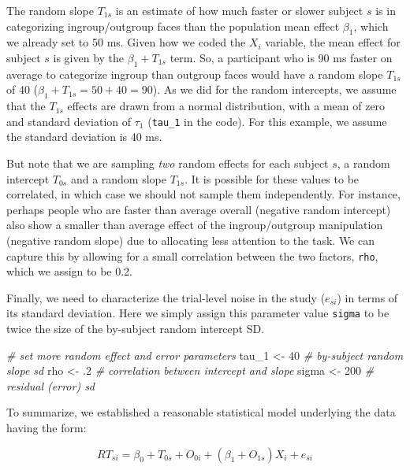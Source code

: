 \documentclass[
  english,
  doc,floatsintext]{apa6}
\newenvironment{Shaded}{\begin{snugshade}}{\end{snugshade}}
\newcommand{\CommentTok}[1]{\textcolor[rgb]{0.56,0.35,0.01}{\textit{#1}}}
\newcommand{\DecValTok}[1]{\textcolor[rgb]{0.00,0.00,0.81}{#1}}
\newcommand{\FloatTok}[1]{\textcolor[rgb]{0.00,0.00,0.81}{#1}}
\newcommand{\NormalTok}[1]{#1}
\newcommand{\StringTok}[1]{\textcolor[rgb]{0.31,0.60,0.02}{#1}}
\begin{document}
The random slope \(T_{1s}\) is an estimate of how much faster or slower subject \(s\) is in categorizing ingroup/outgroup faces than the population mean effect \(\beta_1\), which we already set to 50 ms. Given how we coded the \(X_i\) variable, the mean effect for subject \(s\) is given by the \(\beta_1 + T_{1s}\) term. So, a participant who is 90 ms faster on average to categorize ingroup than outgroup faces would have a random slope \(T_{1s}\) of 40 (\(\beta_1 + T_{1s} = 50 + 40 = 90\)). As we did for the random intercepts, we assume that the \(T_{1s}\) effects are drawn from a normal distribution, with a mean of zero and standard deviation of \(\tau_1\) (\texttt{tau\_1} in the code). For this example, we assume the standard deviation is 40 ms.

But note that we are sampling \emph{two} random effects for each subject \(s\), a random intercept \(T_{0s}\) and a random slope \(T_{1s}\). It is possible for these values to be correlated, in which case we should not sample them independently. For instance, perhaps people who are faster than average overall (negative random intercept) also show a smaller than average effect of the ingroup/outgroup manipulation (negative random slope) due to allocating less attention to the task. We can capture this by allowing for a small correlation between the two factors, \texttt{rho}, which we assign to be 0.2.

Finally, we need to characterize the trial-level noise in the study (\(e_{si}\)) in terms of its standard deviation. Here we simply assign this parameter value \texttt{sigma} to be twice the size of the by-subject random intercept SD.

\begin{Shaded}
\begin{Highlighting}[]
\CommentTok{# set more random effect and error parameters}
\NormalTok{tau_}\DecValTok{1}\NormalTok{  <-}\StringTok{  }\DecValTok{40} \CommentTok{# by-subject random slope sd}
\NormalTok{rho    <-}\StringTok{  }\FloatTok{.2} \CommentTok{# correlation between intercept and slope}
\NormalTok{sigma  <-}\StringTok{ }\DecValTok{200} \CommentTok{# residual (error) sd}
\end{Highlighting}
\end{Shaded}

To summarize, we established a reasonable statistical model underlying the data having the form:

\begin{equation}
RT_{si} = \beta_0 + T_{0s} + O_{0i} + \left(\beta_1 + O_{1s}\right) X_i + e_{si}
\end{equation}
\end{document}
